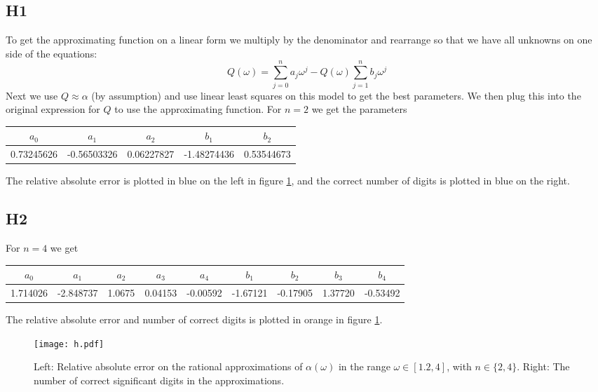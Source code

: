 \documentclass[a4paper,10pt]{article}
\begin{document}
	\subsection*{H1}
	To get the approximating function on a linear form we multiply by the denominator and rearrange so that we have all unknowns on one side of the equations:
	\begin{equation}\label{key}
		Q(\omega) = \sum_{j=0}^{n} a_j \omega^j - Q(\omega) \sum_{j=1}^{n} b_j \omega^j
	\end{equation}
	Next we use $ Q \approx \alpha $ (by assumption) and use linear least squares on this model to get the best parameters. We then plug this into the original expression for $ Q $ to use the approximating function. For $ n=2 $ we get the parameters
	\begin{table}[H]
		\centering
		\begin{tabular}{c|c|c|c|c}
			$ a_0 $ & $ a_1 $ & $ a_2 $ & $ b_1 $ & $ b_2 $ \\
			\hline
			0.73245626 & -0.56503326 & 0.06227827 & -1.48274436 & 0.53544673
		\end{tabular}
	\end{table}
	The relative absolute error is plotted in blue on the left in figure \ref{fig:error2}, and the correct number of digits is plotted in blue on the right.
	
	\subsection*{H2}
	For $ n=4 $ we get
	\begin{table}[H]
		\centering
		\begin{tabular}{c|c|c|c|c|c|c|c|c}
			$ a_0 $ & $ a_1 $ & $ a_2 $ & $ a_3 $ & $ a_4 $ & $ b_1 $ & $ b_2 $ & $ b_3 $ & $ b_4 $ \\
			\hline
			1.714026 & -2.848737 & 1.0675 & 0.04153 & -0.00592 & -1.67121 & -0.17905 & 1.37720 & -0.53492
		\end{tabular}
	\end{table}
	The relative absolute error and number of correct digits is plotted in orange in figure \ref{fig:error2}.
	\begin{figure}[H]
		\centering
		\texttt{[image: h.pdf]}
		\caption{Left: Relative absolute error on the rational approximations of $ \alpha(\omega) $ in the range $ \omega \in [1.2, 4] $, with $ n\in \{2, 4\} $. Right: The number of correct significant digits in the approximations.}
		\label{fig:error2}
	\end{figure}
	
	
\end{document}
